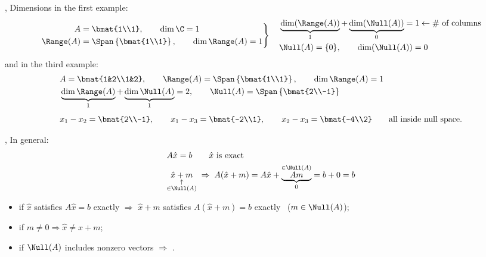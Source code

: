 \sep
Dimensions in the first example:
\begin{gather*}
\left.\begin{aligned}
A &= \bmat{1\\1}, \qquad \dim\C = 1\\
\Range(A) &= \Span\left\{\bmat{1\\1}\right\}, \qquad \dim\Range(A) = 1
\end{aligned}\right\}
\quad
\begin{aligned}
&\underbrace{\dim(\Range(A))}_{1} + \underbrace{\dim(\Null(A))}_{0} = 1 \leftarrow \#\text{ of columns}\\
&\Null(A) = \{0\}, \qquad \dim(\Null(A)) = 0
\end{aligned}
\end{gather*}
and in the third example:
\begin{align*}
&A = \bmat{1&2\\1&2}, \qquad \Range(A) = \Span\left\{\bmat{1\\1}\right\}, \qquad \dim\Range(A) = 1\\
&\underbrace{\dim\Range(A)}_{1} + \underbrace{\dim\Null(A)}_{1} = 2, \qquad
\Null(A) = \Span\left\{\bmat{2\\-1}\right\}\\[4pt]
&x_1-x_2 = \bmat{2\\-1}, \qquad x_1-x_3 = \bmat{-2\\1}, \qquad x_2-x_3 = \bmat{-4\\2} \qquad \text{all inside null space.}
\end{align*}

\sep
In general:
\begin{align*}
&A\hat x = b \qquad \hat x \text{ is exact}\\
&\underset{\substack{\uparrow\\ \in\Null(A)}}{\hat x + m} \;\Rightarrow\; A(\hat x+m) = A\hat x + \underbrace{\overset{\in\Null(A)}{Am}}_{0} = b+0 = b
\end{align*}
\begin{itemize}[nosep]
  \item if $\hat x$ satisfies $A\hat x = b$ exactly $\Rightarrow$ $\hat x + m$ satisfies $A(\hat x+m) = b$ exactly \ ($m\in\Null(A)$);
  \item if $m\neq 0 \Rightarrow \hat x \neq \hat x + m$;
  \item if $\Null(A)$ includes nonzero vectors $\Rightarrow$ .
\end{itemize}

